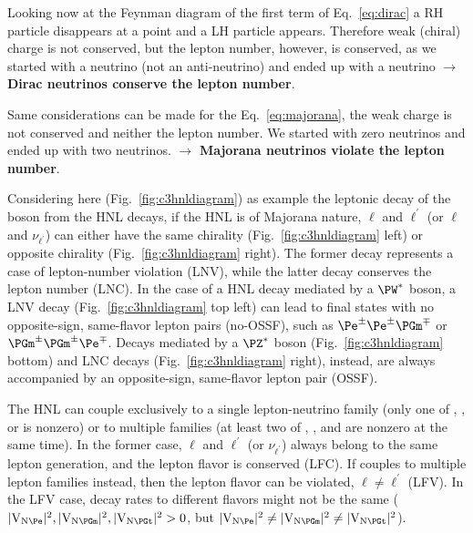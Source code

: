 Looking now at the Feynman diagram of the first term of
Eq.~\ref{eq:dirac} a RH particle disappears at a point and a LH
particle appears. Therefore weak (chiral) charge is not conserved, but
the lepton number, however, is conserved, as we started with a
neutrino (not an anti-neutrino) and ended up with a neutrino
$\rightarrow$ \textbf{Dirac neutrinos conserve the lepton number}.

Same considerations can be made for the Eq.~\ref{eq:majorana}, the
weak charge is not conserved and neither the lepton number. We started
with zero neutrinos and ended up with two neutrinos. $\rightarrow$
\textbf{Majorana neutrinos violate the lepton number}.

Considering here (Fig.~\ref{fig:c3hnldiagram}) as example the leptonic decay of the \PW boson from the HNL decays, if the HNL is of Majorana nature, $\ell$ and $\ell^\prime$ (or $\ell$
and $\nu_{\ell^\prime}$) can either have the same chirality
(Fig.~\ref{fig:c3hnldiagram} left) or opposite chirality
(Fig.~\ref{fig:c3hnldiagram} right). The former decay represents a case
of lepton-number violation (LNV), while the latter decay conserves the
lepton number (LNC).
In the case of a HNL decay mediated by a $\PW^\ast$ boson, a LNV decay
(Fig.~\ref{fig:c3hnldiagram} top left)
can lead to final states with no opposite-sign, same-flavor lepton
pairs (no-OSSF), such as $\Pe^\pm\Pe^\pm\PGm^\mp$ or
$\PGm^\pm\PGm^\pm\Pe^\mp$.
Decays mediated by a $\PZ^\ast$ boson (Fig.~\ref{fig:c3hnldiagram}
bottom) and LNC decays (Fig.~\ref{fig:c3hnldiagram} right), instead, are
always accompanied by an opposite-sign, same-flavor lepton pair
(OSSF).

The HNL can couple exclusively to a single lepton-neutrino family
(\ie only one of \mixpare, \mixparm, or \mixpart is nonzero)
or to multiple families (\ie at least two of \mixpare, \mixparm,
and \mixpart are nonzero at the same time).
In the former case, $\ell$ and $\ell^\prime$ (or
$\nu_{\ell^{\prime}}$) always belong to the same lepton generation,
and the lepton flavor is conserved (LFC).
If \hnl couples to multiple lepton families instead, then the
lepton flavor can be violated, $\ell\neq\ell^\prime$ (LFV).
In the LFV case, decay rates to different flavors might not be the
same ($\mixpare,\mixparm,\mixpart>0$, but
$\mixpare\neq\mixparm\neq\mixpart$).

